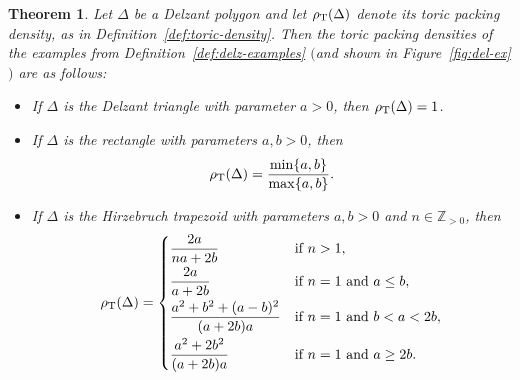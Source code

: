 \documentclass[pdftex]{sigma}
\numberwithin{equation}{section}
\newtheorem{Theorem}{Theorem}[section]
\def\Z{{\mathbb Z}}
\newcommand{\De}{\Delta}
\begin{document}
\begin{Theorem}\label{thm:toric-examples}
 Let $\De$ be a Delzant polygon and let $\rho_{{\rm T}}(\De)$ denote its toric packing density, as in Definition~{\rm \ref{def:toric-density}}. Then the toric packing densities of the examples from Definition~{\rm \ref{def:delz-examples}} $($and shown in Figure~{\rm \ref{fig:del-ex}}$)$ are as follows:
 \begin{itemize}\itemsep=0pt
 \item If $\De$ is the Delzant triangle with parameter $a>0$, then $\rho_{{\rm T}}(\De) = 1$.
 \item If $\De$ is the rectangle with parameters $a,b>0$, then \[\rho_{{\rm T}}(\De) = \frac{\min \{a,b\}}{\max\{a,b\}}.\]
 \item If $\De$ is the Hirzebruch trapezoid with parameters $a,b>0$ and $n\in\Z_{>0}$, then
 \begin{equation*}
 \rho_{{\rm T}}(\De) = \begin{cases}
 \dfrac{2a}{na+2b} & \text{if }n>1,\vspace{1mm}\\
 \dfrac{2a}{a+2b} & \text{if }n=1 \text{ and }a\leq b,\vspace{1mm}\\
 \dfrac{a^2+b^2+ (a-b)^2}{(a+2b)a} & \text{if }n=1 \text{ and } b < a < 2b,\vspace{1mm}\\
 \dfrac{a^2+2b^2}{(a+2b)a} & \text{if }n=1 \text{ and } a \geq 2b. \end{cases}
\end{equation*}
 \end{itemize}
\end{Theorem}
\end{document}

